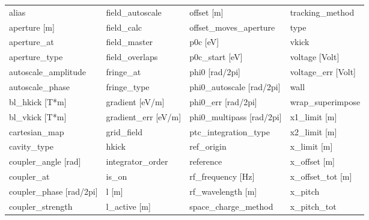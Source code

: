  \begin{tabular}{llll} \toprule
alias                            & field_autoscale                  & offset [m]                       & tracking_method                  \\
aperture [m]                     & field_calc                       & offset_moves_aperture            & type                             \\
aperture_at                      & field_master                     & p0c [eV]                         & vkick                            \\
aperture_type                    & field_overlaps                   & p0c_start [eV]                   & voltage [Volt]                   \\
autoscale_amplitude              & fringe_at                        & phi0 [rad/2pi]                   & voltage_err [Volt]               \\
autoscale_phase                  & fringe_type                      & phi0_autoscale [rad/2pi]         & wall                             \\
bl_hkick [T*m]                   & gradient [eV/m]                  & phi0_err [rad/2pi]               & wrap_superimpose                 \\
bl_vkick [T*m]                   & gradient_err [eV/m]              & phi0_multipass [rad/2pi]         & x1_limit [m]                     \\
cartesian_map                    & grid_field                       & ptc_integration_type             & x2_limit [m]                     \\
cavity_type                      & hkick                            & ref_origin                       & x_limit [m]                      \\
coupler_angle [rad]              & integrator_order                 & reference                        & x_offset [m]                     \\
coupler_at                       & is_on                            & rf_frequency [Hz]                & x_offset_tot [m]                 \\
coupler_phase [rad/2pi]          & l [m]                            & rf_wavelength [m]                & x_pitch                          \\
coupler_strength                 & l_active [m]                     & space_charge_method              & x_pitch_tot                      \\

\end{tabular}
